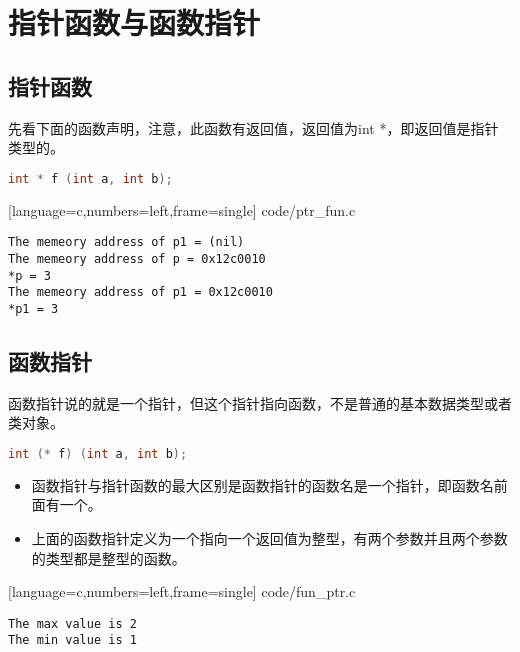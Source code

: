 \section{指针函数与函数指针}

\subsection{指针函数}
\begin{frame}[fragile]\ft{\subsecname}
先看下面的函数声明，注意，此函数有返回值，返回值为{\tf int *}，即返回值是指针类型的。
  \begin{lstlisting}[language=c,backgroundcolor=\color{red!20}]
int * f (int a, int b);    
  \end{lstlisting}
\end{frame}


\begin{frame}\ft{\subsecname}

[language=c,numbers=left,frame=single]
{code/ptr_fun.c}
\end{frame}


\begin{frame}[fragile]\ft{\subsecname}
  \begin{lstlisting}[backgroundcolor=\color{blue!20}]
The memeory address of p1 = (nil) 
The memeory address of p = 0x12c0010 
*p = 3 
The memeory address of p1 = 0x12c0010 
*p1 = 3     
  \end{lstlisting}
\end{frame}


\subsection{函数指针}
\begin{frame}[fragile]\ft{\subsecname}
函数指针说的就是一个指针，但这个指针指向函数，不是普通的基本数据类型或者类对象。
  \begin{lstlisting}[language=c,backgroundcolor=\color{red!20}]
int (* f) (int a, int b);    
  \end{lstlisting}
  \begin{itemize}
  \item
    函数指针与指针函数的最大区别是函数指针的函数名是一个指针，即函数名前面有一个{\tf *}。 
  \item
    上面的函数指针定义为一个指向一个返回值为整型，有两个参数并且两个参数的类型都是整型的函数。
  \end{itemize}
\end{frame}

\begin{frame}\ft{\subsecname}

[language=c,numbers=left,frame=single]
{code/fun_ptr.c}
\end{frame}


\begin{frame}[fragile]\ft{\subsecname}
  \begin{lstlisting}[backgroundcolor=\color{blue!20}]
The max value is 2 
The min value is 1 
  \end{lstlisting}
\end{frame}
